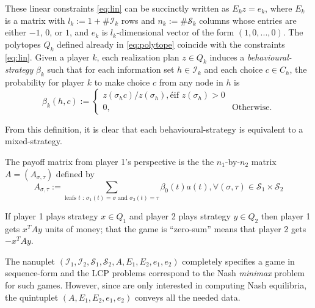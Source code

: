 \documentclass{article} %
\begin{document}
These linear constraints \eqref{eq:lin} can be succinctly written as $E_k z = e_k$,
where $E_k$ is a matrix with $l_k := 1 + \#\mathcal{I}_k$ rows and $n_k := \#\mathcal{S}_k$ columns whose entries are either $-1$, $0$, or $1$, and $e_k$ is $l_k$-dimensional vector of the form $(1, 0, ..., 0)$. The polytopes $Q_k$ defined already in \eqref{eq:polytope} coincide with the constraints \eqref{eq:lin}. Given a player $k$, each realization plan $z \in Q_k$ induces a \textit{behavioural-strategy} $\beta_k$ such that for each information set $h \in \mathcal{I}_k$ and each choice $c \in C_h$, the probability for player $k$ to make choice $c$ from any node in $h$ is
\begin{equation}
  \beta_k(h, c) := \begin{cases}
    z(\sigma_hc)/z(\sigma_h), é\mbox{if } z(\sigma_h) > 0\\
    0, &\mbox{Otherwise}.
  \end{cases}
\end{equation}

From this definition, it is clear that each behavioural-strategy is equivalent to a mixed-strategy.

The payoff matrix from player 1's perspective is the the $n_1$-by-$n_2$ matrix $A = (A_{\sigma,\tau})$ defined by
\begin{equation}
    A_{\sigma,\tau} := \sum_{\text{leafs }t\text{ : } \sigma_1(t) = \sigma\text{ and } \sigma_2(t) = \tau}{\beta_0(t)a(t)}, \forall (\sigma, \tau) \in \mathcal{S}_1 \times \mathcal{S}_2
  \end{equation}

If player 1 plays strategy $x \in Q_1$ and player 2 plays strategy $y \in Q_2$ then player 1 gets $x^TAy$ units of money; that the game is ``zero-sum'' means that player 2 gets $-x^TAy$.

The nanuplet $(\mathcal{I}_1, \mathcal{I}_2, \mathcal{S}_1, \mathcal{S}_2, A, E_1, E_2, e_1, e_2)$ completely specifies a game in sequence-form and the LCP problems correspond to the Nash \textit{minimax} problem for such games. However, since are only interested in computing Nash equilibria, the quintuplet $(A, E_1, E_2, e_1, e_2)$ conveys all the needed data.
\end{document}
